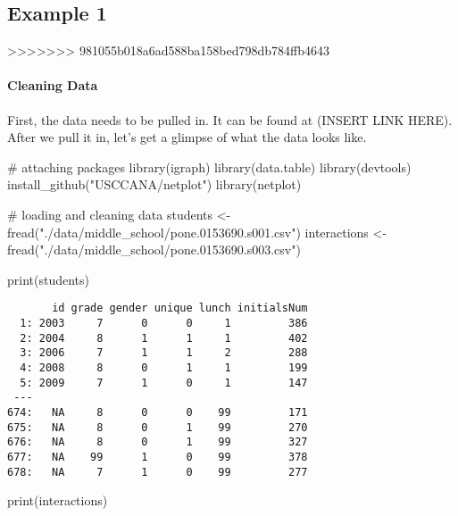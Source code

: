 \documentclass[
]{apa7}
\let\oldparagraph\paragraph
\renewcommand{\paragraph}[1]{\oldparagraph{#1}\mbox{}}
\newenvironment{Shaded}{\begin{snugshade}}{\end{snugshade}}
\newcommand{\CommentTok}[1]{\textcolor[rgb]{0.37,0.37,0.37}{#1}}
\newcommand{\FunctionTok}[1]{\textcolor[rgb]{0.28,0.35,0.67}{#1}}
\newcommand{\NormalTok}[1]{\textcolor[rgb]{0.00,0.23,0.31}{#1}}
\newcommand{\OtherTok}[1]{\textcolor[rgb]{0.00,0.23,0.31}{#1}}
\newcommand{\StringTok}[1]{\textcolor[rgb]{0.13,0.47,0.30}{#1}}
\begin{document}
\subsection{Example 1}
>>>>>>> 981055b018a6ad588ba158bed798db784ffb4643

\hypertarget{cleaning-data}{%
\paragraph{Cleaning Data}\label{cleaning-data}}

First, the data needs to be pulled in. It can be found at (INSERT LINK
HERE). After we pull it in, let's get a glimpse of what the data looks
like.

\begin{Shaded}
\begin{Highlighting}[]
\CommentTok{\# attaching packages}
\FunctionTok{library}\NormalTok{(igraph)}
\FunctionTok{library}\NormalTok{(data.table)}
\FunctionTok{library}\NormalTok{(devtools)}
\FunctionTok{install\_github}\NormalTok{(}\StringTok{"USCCANA/netplot"}\NormalTok{)}
\FunctionTok{library}\NormalTok{(netplot)}


\CommentTok{\# loading and cleaning data}
\NormalTok{students }\OtherTok{\textless{}{-}} \FunctionTok{fread}\NormalTok{(}\StringTok{"./data/middle\_school/pone.0153690.s001.csv"}\NormalTok{)}
\NormalTok{interactions }\OtherTok{\textless{}{-}} \FunctionTok{fread}\NormalTok{(}\StringTok{"./data/middle\_school/pone.0153690.s003.csv"}\NormalTok{)}

\FunctionTok{print}\NormalTok{(students)}
\end{Highlighting}
\end{Shaded}

\begin{verbatim}
       id grade gender unique lunch initialsNum
  1: 2003     7      0      0     1         386
  2: 2004     8      1      1     1         402
  3: 2006     7      1      1     2         288
  4: 2008     8      0      1     1         199
  5: 2009     7      1      0     1         147
 ---                                           
674:   NA     8      0      0    99         171
675:   NA     8      0      1    99         270
676:   NA     8      0      1    99         327
677:   NA    99      1      0    99         378
678:   NA     7      1      0    99         277
\end{verbatim}

\begin{Shaded}
\begin{Highlighting}[]
\FunctionTok{print}\NormalTok{(interactions)}
\end{Highlighting}
\end{Shaded}
\end{document}
